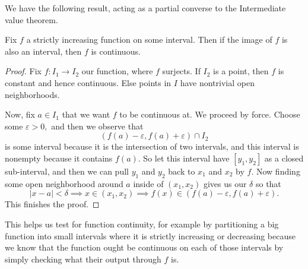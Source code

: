 \documentclass[../notes.tex]{subfiles}
\begin{document}
We have the following result, acting as a partial converse to the Intermediate value theorem.
\begin{proposition}
	Fix $f$ a strictly increasing function on some interval. Then if the image of $f$ is also an interval, then $f$ is continuous.
\end{proposition}
\begin{proof}
	Fix $f:I_1\to I_2$ our function, where $f$ surjects. If $I_2$ is a point, then $f$ is constant and hence continuous. Else points in $I$ have nontrivial open neighborhoods.
	
	Now, fix $a\in I_1$ that we want $f$ to be continuous at. We proceed by force. Choose some $\varepsilon>0,$ and then we observe that
	\[(f(a)-\varepsilon,f(a)+\varepsilon)\cap I_2\]
	is some interval because it is the intersection of two intervals, and this interval is nonempty because it contains $f(a).$ So let this interval have $[y_1,y_2]$ as a closed sub-interval, and then we can pull $y_1$ and $y_2$ back to $x_1$ and $x_2$ by $f.$ Now finding some open neighborhood around $a$ inside of $(x_1,x_2)$ gives us our $\delta$ so that
	\[|x-a|<\delta\implies x\in(x_1,x_2)\implies f(x)\in(f(a)-\varepsilon,f(a)+\varepsilon).\]
	This finishes the proof.
\end{proof}
This helps us test for function continuity, for example by partitioning a big function into small intervals where it is strictly increasing or decreasing because we know that the function ought be continuous on each of those intervals by simply checking what their output through $f$ is.
\end{document}
